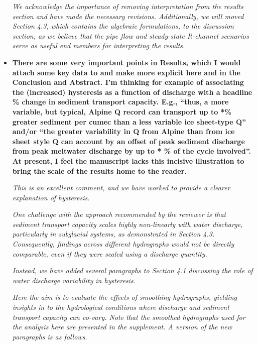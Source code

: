 \documentclass[11pt]{article}
\begin{document}
\begin{itemize}
\textit{We acknowledge the importance of removing interpretation from the results section and have made the necessary revisions. Additionally, we will moved Section 4.3, which contains the algebraic formulations, to the discussion section, as we believe that the pipe flow and steady-state R-channel scenarios serve as useful end members for interpreting the results.
}


  
\item \textbf{There are some very important points in Results, which I would attach some key data to
    and make more explicit here and in the Conclusion and Abstract. I’m thinking for example of
    associating the (increased) hysteresis as a function of discharge with a headline \% change in
    sediment transport capacity. E.g., “thus, a more variable, but typical, Alpine Q record can
    transport up to *\% greater sediment per cumec than a less variable ice sheet-type Q” and/or “the
    greater variability in Q from Alpine than from ice sheet style Q can account by an offset of peak
    sediment discharge from peak meltwater discharge by up to * \% of the cycle involved”. At present,
    I feel the manuscript lacks this incisive illustration to bring the scale of the results home to the
    reader.}

  \textit{This is an excellent comment, and we have worked to provide a clearer explanation of hysteresis.}

\textit{One challenge with the approach recommended by the reviewer is that sediment transport capacity scales highly non-linearly with water discharge, particularly in subglacial systems, as demonstrated in Section 4.3. Consequently, findings across different hydrographs would not be directly comparable, even if they were scaled using a discharge quantity.}

\textit{Instead, we have added several paragraphs to Section 4.1 discussing the role of water discharge variability in hysteresis.}

  \textit{Here the aim is to evaluate the effects of smoothing hydrographs, yielding insights in to the hydrological conditions where discharge and sediment transport capacity can co-vary.
    Note that the smoothed hydrographs used for the analysis here are presented in the supplement. 
    A version of the new paragraphs is as follows.}



\end{itemize}
\end{document}
